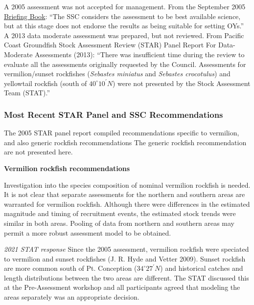 \documentclass[11pt,
  english,
  a4paper,
]{article}
\begin{document}
A 2005 assessment was not accepted for management. From the September 2005 {\href{https://www.pcouncil.org/documents/2005/09/f-groundfish-management-september-2005.pdf/}{Briefing Book}\leavevmode\tagmcend\tagstructend}: ``The SSC considers the assessment to be best available science, but at this stage does not endorse the results as being suitable for setting OYs.'' A 2013 data moderate assessment was prepared, but not reviewed. From Pacific Coast Groundfish Stock Assessment Review (STAR) Panel Report For Data-Moderate Assessments (2013): ``There was insufficient time during the review to evaluate all the assessments originally requested by the Council. Assessments for vermilion/sunset rockfishes (\emph{Sebastes miniatus} and \emph{Sebastes crocotulus}) and yellowtail rockfish (south of $40^\circ 10^\prime N$) were not presented by the Stock Assessment Team (STAT).''


\hypertarget{most-recent-star-panel-and-ssc-recommendations}{%
\subsubsection{Most Recent STAR Panel and SSC Recommendations}\label{most-recent-star-panel-and-ssc-recommendations}}

\leavevmode\tagmcend\tagstructend

The 2005 STAR panel report compiled recommendations specific to vermilion, and also generic rockfish recommendations The generic rockfish recommendation are not presented here.

\textbf{Vermilion rockfish recommendations}

Investigation into the species composition of nominal vermilion rockfish is needed. It is not clear that separate assessments for the northern and southern areas are warranted for vermilion rockfish. Although there were differences in the estimated magnitude and timing of recruitment events, the estimated stock trends were similar in both areas. Pooling of data from northern and southern areas may permit a more robust assessment model to be obtained.

\emph{2021 STAT response} Since the 2005 assessment, vermilion rockfish were speciated to vermilion and sunset rockfishes {(J. R. Hyde and Vetter 2009)\leavevmode\tagmcend\tagstructend}. Sunset rockfish are more common south of Pt. Conception ($34^\circ 27^\prime N$) and historical catches and length distributions between the two areas are different. The STAT discussed this at the Pre-Assessment workshop and all participants agreed that modeling the areas separately was an appropriate decision.
\end{document}
